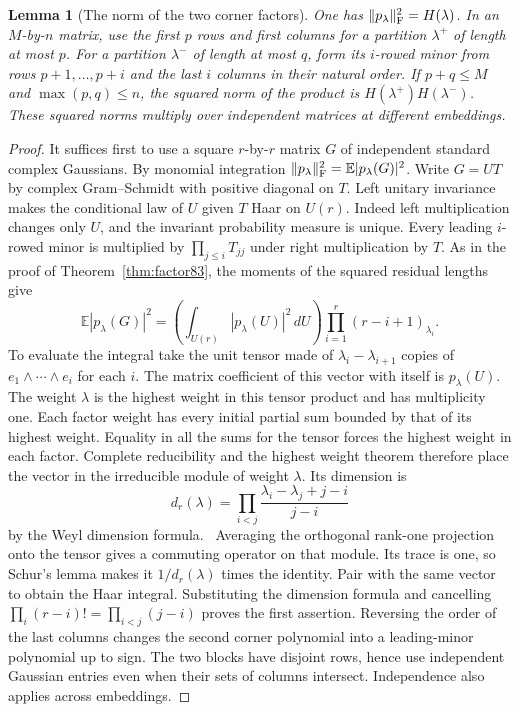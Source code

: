 \documentclass[a4paper,11pt]{article}
\newtheorem{lemma}[proposition]{Lemma}
\theoremstyle{definition}
\theoremstyle{remark}
\numberwithin{equation}{section}
\begin{document}
\begin{lemma}[The norm of the two corner factors]\label{lem:hook86}
One has \(\|p_\lambda\|_{\rm F}^2=H(\lambda)\).
In an \(M\)-by-\(n\) matrix, use the first \(p\) rows and first
columns for a partition \(\lambda^+\) of length at most \(p\).
For a partition \(\lambda^-\) of length at most \(q\), form its
\(i\)-rowed minor from rows \(p+1,\ldots,p+i\) and the last \(i\)
columns in their natural order. If \(p+q\le M\) and
\(\max(p,q)\le n\), the squared norm of the product is
\(H(\lambda^+)H(\lambda^-)\). These squared norms multiply over
independent matrices at different embeddings.
\end{lemma}
\begin{proof}
It suffices first to use a square \(r\)-by-\(r\) matrix \(G\)
of independent standard complex Gaussians. By monomial integration
\(\|p_\lambda\|_{\rm F}^2=\mathbb E|p_\lambda(G)|^2\).
Write \(G=UT\) by complex Gram--Schmidt with positive diagonal
on \(T\). Left unitary invariance makes the conditional law of
\(U\) given \(T\) Haar on \(U(r)\). Indeed left multiplication
changes only \(U\), and the invariant probability measure is unique.
Every leading \(i\)-rowed minor is multiplied by
\(\prod_{j\le i}T_{jj}\) under right multiplication by \(T\).
As in the proof of Theorem~\ref{thm:factor83}, the moments of the
squared residual lengths give
\[
 \mathbb E |p_\lambda(G)|^2=
 \left(\int_{U(r)}|p_\lambda(U)|^2\,dU\right)
           \prod_{i=1}^r(r-i+1)_{\lambda_i}.
\]
To evaluate the integral take the unit tensor made of
\(\lambda_i-\lambda_{i+1}\) copies of
\(e_1\wedge\cdots\wedge e_i\) for each \(i\). The matrix
coefficient of this vector with itself is \(p_\lambda(U)\).
The weight \(\lambda\) is the highest weight in this tensor
product and has multiplicity one. Each factor weight has every
initial partial sum bounded by that of its highest weight.
Equality in all the sums for the tensor forces the highest
weight in each factor. Complete reducibility and the highest
weight theorem therefore place the vector in the irreducible
module of weight \(\lambda\). Its dimension is
\[
 d_r(\lambda)=\prod_{i<j}
               \frac{\lambda_i-\lambda_j+j-i}{j-i}
\]
by the Weyl dimension formula.~\cite[Thm.~5.22.1]{XVIII-XIII-IV-etingof86}
Averaging the orthogonal rank-one projection onto the tensor
gives a commuting operator on that module. Its trace is one, so
Schur's lemma makes it \(1/d_r(\lambda)\) times the identity.
Pair with the same vector to obtain the Haar integral. Substituting
the dimension formula and cancelling
\(\prod_i(r-i)!=\prod_{i<j}(j-i)\) proves the first assertion.
Reversing the order of the last columns changes the second corner
polynomial into a leading-minor polynomial up to sign. The two
blocks have disjoint rows, hence use independent Gaussian entries
even when their sets of columns intersect. Independence also
applies across embeddings.
\end{proof}
\end{document}
